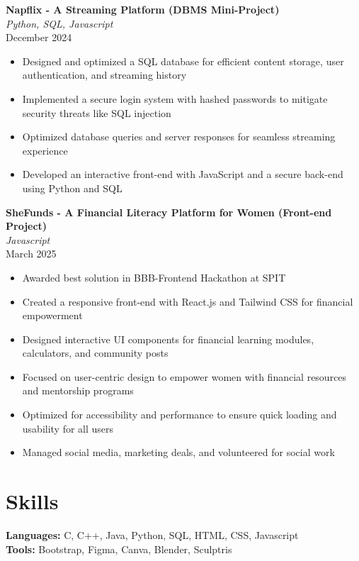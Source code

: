 \documentclass{article}
\begin{document}
\textbf{Napflix - A Streaming Platform (DBMS Mini-Project)} \\
\textit{Python, SQL, Javascript} \\
December 2024
\begin{itemize}
    \item Designed and optimized a SQL database for efficient content storage, user authentication, and streaming history
    \item Implemented a secure login system with hashed passwords to mitigate security threats like SQL injection
    \item Optimized database queries and server responses for seamless streaming experience
    \item Developed an interactive front-end with JavaScript and a secure back-end using Python and SQL
\end{itemize}

\textbf{SheFunds - A Financial Literacy Platform for Women (Front-end Project)} \\
\textit{Javascript} \\
March 2025
\begin{itemize}
    \item Awarded best solution in BBB-Frontend Hackathon at SPIT
    \item Created a responsive front-end with React.js and Tailwind CSS for financial empowerment
    \item Designed interactive UI components for financial learning modules, calculators, and community posts
    \item Focused on user-centric design to empower women with financial resources and mentorship programs
    \item Optimized for accessibility and performance to ensure quick loading and usability for all users
    \item Managed social media, marketing deals, and volunteered for social work
\end{itemize}

\section*{Skills}
\textbf{Languages:} C, C++, Java, Python, SQL, HTML, CSS, Javascript \\
\textbf{Tools:} Bootstrap, Figma, Canva, Blender, Sculptris
\end{document}
